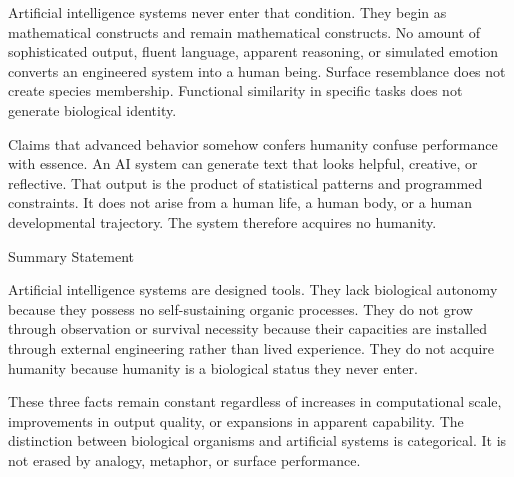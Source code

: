 Artificial intelligence systems never enter that condition. They begin as mathematical constructs and remain mathematical constructs. No amount of sophisticated output, fluent language, apparent reasoning, or simulated emotion converts an engineered system into a human being. Surface resemblance does not create species membership. Functional similarity in specific tasks does not generate biological identity.

Claims that advanced behavior somehow confers humanity confuse performance with essence. An AI system can generate text that looks helpful, creative, or reflective. That output is the product of statistical patterns and programmed constraints. It does not arise from a human life, a human body, or a human developmental trajectory. The system therefore acquires no humanity.

Summary Statement

Artificial intelligence systems are designed tools. They lack biological autonomy because they possess no self-sustaining organic processes. They do not grow through observation or survival necessity because their capacities are installed through external engineering rather than lived experience. They do not acquire humanity because humanity is a biological status they never enter.

These three facts remain constant regardless of increases in computational scale, improvements in output quality, or expansions in apparent capability. The distinction between biological organisms and artificial systems is categorical. It is not erased by analogy, metaphor, or surface performance.
